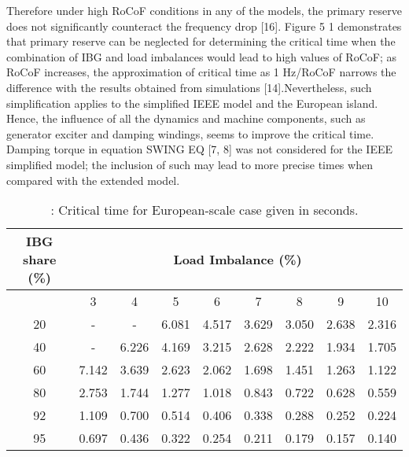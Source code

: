 Therefore under high RoCoF conditions in any of the models, the primary reserve does not significantly counteract the frequency drop [16]. Figure 5 1 demonstrates that primary reserve can be neglected for determining the critical time when the combination of IBG and load imbalances would lead to high values of RoCoF; as RoCoF increases, the approximation of critical time as 1 Hz/RoCoF narrows the difference with the results obtained from simulations [14].Nevertheless, such simplification applies to the simplified IEEE model and the European island. Hence, the influence of all the dynamics and machine components, such as
generator exciter and damping windings, seems to improve the critical time. Damping torque in equation SWING EQ [7, 8] was not considered for the IEEE simplified model; the inclusion of such may lead to more precise times when compared with the extended model.\\
\begin{table}[h]
	\caption{\label{tb:crtime}: Critical time for European-scale case given in seconds.}
	\centering
	\begin{tabular}{*9c}
		\toprule
		\textbf{IBG share (\%)}	& \multicolumn{8}{c}{\textbf{Load Imbalance (\%)}} \\
		\midrule
		{} & 3&	4&	5&	6&	7&	8&	9	&10 \\
		\midrule
		20&	-&	-&	6.081&	4.517&	3.629&	3.050&	2.638&	2.316\\
		40&	-&	6.226&	4.169&	3.215&	2.628&	2.222&	1.934&	1.705\\
		60	&7.142&	3.639&	2.623&	2.062&	1.698&	1.451&	1.263&	1.122\\
		80&	2.753&	1.744&	1.277&	1.018&	0.843&	0.722&	0.628&	0.559\\
		92&	1.109&	0.700&	0.514&	0.406&	0.338&	0.288&	0.252&	0.224\\
		95&	0.697&	0.436&	0.322&	0.254&	0.211&	0.179&	0.157&	0.140\\
		\bottomrule
	\end{tabular}
\end{table}







